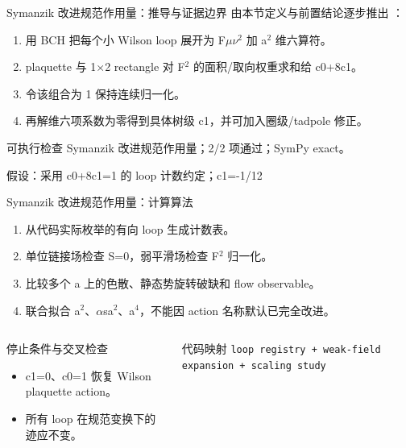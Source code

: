 \begin{frame}[t]{Symanzik 改进规范作用量：推导与证据边界}
\footnotesize
{}\quad 由本节定义与前置结论逐步推出 ：
\begin{enumerate}
\item 用 BCH 把每个小 Wilson loop 展开为 F\ensuremath{\mu}\ensuremath{\nu}\ensuremath{^{2}} 加 a\ensuremath{^{2}} 维六算符。
\item plaquette 与 1\ensuremath{\times}2 rectangle 对 F\ensuremath{^{2}} 的面积/\allowbreak{}取向权重求和给 c0+8c1。
\item 令该组合为 1 保持连续归一化。
\item 再解维六项系数为零得到具体树级 c1，并可加入圈级/\allowbreak{}tadpole 修正。
\end{enumerate}\begin{block}{可执行检查}
\quad Symanzik 改进规范作用量；2/2 项通过；SymPy exact。
\par\scriptsize 假设：采用 c0+8c1=1 的 loop 计数约定；c1=-1/\allowbreak{}12
\end{block}
\end{frame}

\begin{frame}[t]{Symanzik 改进规范作用量：计算算法}
\footnotesize
{}\begin{enumerate}
\item 从代码实际枚举的有向 loop 生成计数表。
\item 单位链接场检查 S=0，弱平滑场检查 F\ensuremath{^{2}} 归一化。
\item 比较多个 a 上的色散、静态势旋转破缺和 flow observable。
\item 联合拟合 a\ensuremath{^{2}}、\ensuremath{\alpha}sa\ensuremath{^{2}}、a\ensuremath{^{4}}，不能因 action 名称默认已完全改进。
\end{enumerate}\begin{columns}[T,onlytextwidth]
\begin{block}{停止条件与交叉检查}\scriptsize\begin{itemize}
\item[\CheckMark] c1=0、c0=1 恢复 Wilson plaquette action。
\item[\CheckMark] 所有 loop 在规范变换下的迹应不变。
\end{itemize}\end{block}
\begin{block}{代码映射}
\scriptsize \texttt{loop registry + weak-field expansion + scaling study}
\end{block}\end{columns}\end{frame}

